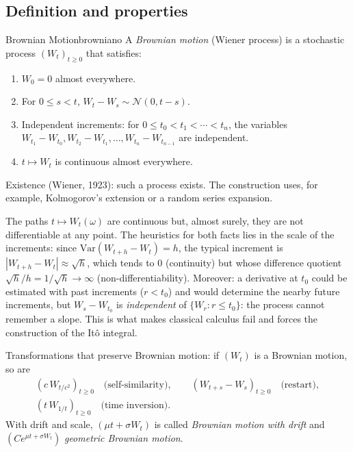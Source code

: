 \documentclass[11pt, a4paper]{article}
\begin{document}
\subsection{Definition and properties}

\begin{definicion}{Brownian Motion}{browniano}
A \emph{Brownian motion} (Wiener process) is a stochastic process
$(W_t)_{t \ge 0}$ that satisfies:
\begin{enumerate}
    \item $W_0 = 0$ almost everywhere.
    \item For $0 \le s < t$, $W_t - W_s \sim \mathcal{N}(0, t - s)$.
    \item Independent increments: for $0 \le t_0 < t_1 < \cdots < t_n$, the variables
    $W_{t_1} - W_{t_0}, W_{t_2} - W_{t_1}, \dots, W_{t_n} - W_{t_{n-1}}$ are independent.
    \item $t \mapsto W_t$ is continuous almost everywhere.
\end{enumerate}
\end{definicion}

\obs Existence (Wiener, 1923): such a process exists. The construction uses, for example,
Kolmogorov's extension or a random series expansion.

\obs The paths $t \mapsto W_t(\omega)$ are continuous but, almost surely, they are not
differentiable at any point. The heuristics for both facts lies in the scale of the
increments: since $\mathrm{Var}(W_{t+h} - W_t) = h$, the typical increment is
$|W_{t+h} - W_t| \approx \sqrt{h}$, which tends to $0$ (continuity) but whose difference
quotient $\sqrt{h}/h = 1/\sqrt{h} \to \infty$ (non-differentiability). Moreover: a derivative at
$t_0$ could be estimated with past increments ($r < t_0$) and would determine the nearby future
increments, but $W_s - W_{t_0}$ is \emph{independent} of $\{W_r : r \le t_0\}$: the
process cannot remember a slope. This is what makes classical calculus fail and
forces the construction of the Itô integral.

\obs Transformations that preserve Brownian motion: if $(W_t)$ is a Brownian motion, so are
\begin{gather*}
(c \, W_{t/c^2})_{t \ge 0} \quad \text{(self-similarity)}, \qquad
(W_{t+s} - W_s)_{t \ge 0} \quad \text{(restart)}, \\
(t \, W_{1/t})_{t \ge 0} \quad \text{(time inversion)}.
\end{gather*}
With drift and scale, $(\mu t + \sigma W_t)$ is called \emph{Brownian motion with drift} and
$(C e^{\mu t + \sigma W_t})$ \emph{geometric Brownian motion}.
\end{document}
